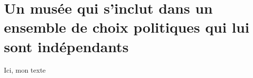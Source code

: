 \section{\label{I-B-2}Un musée qui s'inclut dans un ensemble de choix politiques qui lui sont indépendants}

Ici, mon texte
